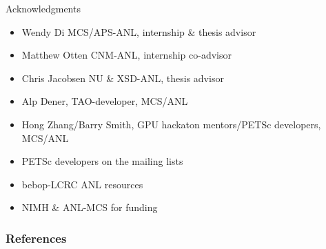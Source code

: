 \documentclass{beamer}
\begin{document}
\begin{frame}{Acknowledgments}
	\begin{itemize}
		\item \alert{Wendy Di} MCS/APS-ANL, internship \& thesis advisor
		\item \alert{Matthew Otten} CNM-ANL, internship co-advisor
		\item \alert{Chris Jacobsen} NU \& XSD-ANL, thesis advisor
		\item \alert{Alp Dener}, TAO-developer, MCS/ANL
		\item \alert{Hong Zhang/Barry Smith}, GPU hackaton mentors/PETSc developers, MCS/ANL
		\item \alert{PETSc developers} on the mailing lists
		\item \alert{bebop-LCRC} ANL resources
		\item \alert{NIMH} \& \alert{ANL-MCS} for funding
	\end{itemize}
\end{frame}

\renewcommand*{\bibfont}{\scriptsize}
\begin{frame}[t, allowframebreaks]
	\frametitle{References}
	
	
\end{frame}
\end{document}
